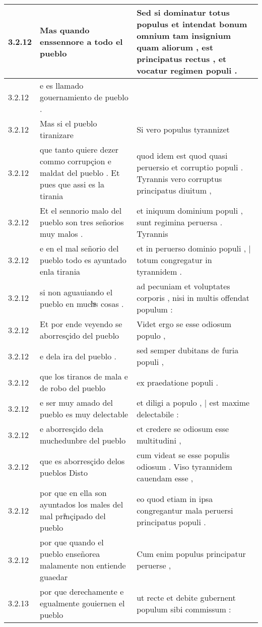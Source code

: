 \begin{tabular}{|p{1cm}|p{6.5cm}|p{6.5cm}|}
3.2.12 & Mas quando enssennore a todo el pueblo & Sed si dominatur totus populus et intendat bonum omnium tam insignium quam aliorum , est principatus rectus , et vocatur regimen populi . \\\hline
3.2.12 & e es llamado gouernamiento de pueblo . &  \\\hline
3.2.12 & Mas si el pueblo tiranizare & Si vero populus tyrannizet \\\hline
3.2.12 & que tanto quiere dezer commo corrupçion e maldat del pueblo . Et pues que assi es la tirania & quod idem est quod quasi peruersio et corruptio populi . Tyrannis vero corruptus principatus diuitum , \\\hline
3.2.12 & Et el sennorio malo del pueblo son tres señorios muy malos . & et iniquum dominium populi , sunt regimina peruersa . Tyrannis \\\hline
3.2.12 & e en el mal señorio del pueblo todo es ayuntado enla tirania & et in peruerso dominio populi , | totum congregatur in tyrannidem . \\\hline
3.2.12 & si non aguauiando el pueblo en muchͣs cosas . & ad pecuniam et voluptates corporis , nisi in multis offendat populum : \\\hline
3.2.12 & Et por ende veyendo se aborresçido del pueblo & Videt ergo se esse odiosum populo , \\\hline
3.2.12 & e dela ira del pueblo . & sed semper dubitans de furia populi , \\\hline
3.2.12 & que los tiranos de mala e de robo del pueblo & ex praedatione populi . \\\hline
3.2.12 & e ser muy amado del pueblo es muy delectable & et diligi a populo , | est maxime delectabile : \\\hline
3.2.12 & e aborresçido dela muchedunbre del pueblo & et credere se odiosum esse multitudini , \\\hline
3.2.12 & que es aborresçido delos pueblos Disto & cum videat se esse populis odiosum . Viso tyrannidem cauendam esse , \\\hline
3.2.12 & por que en ella son ayuntados los males del mal priͥnçipado del pueblo & eo quod etiam in ipsa congregantur mala peruersi principatus populi . \\\hline
3.2.12 & por que quando el pueblo enseñorea malamente non entiende guaedar & Cum enim populus principatur peruerse , \\\hline
3.2.13 & por que derechamente e egualmente gouiernen el pueblo & ut recte et debite gubernent populum sibi commissum : \\\hline

\end{tabular}

